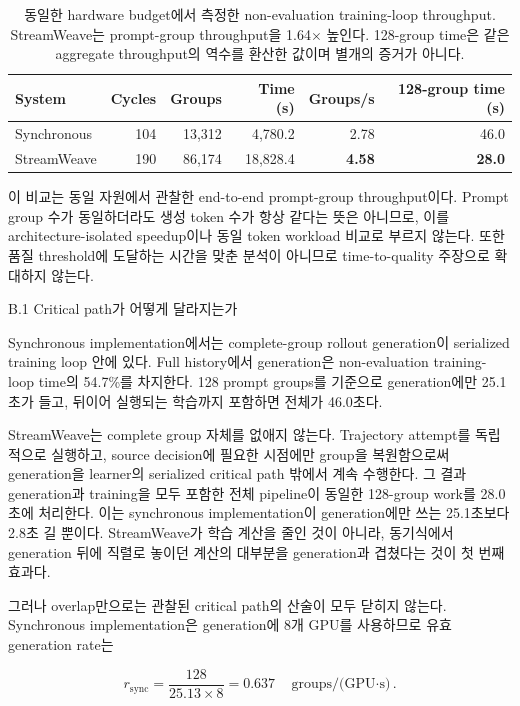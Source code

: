 \begin{table}[h]
\centering
\begin{tabular}{lrrrrr}
\hline
System & Cycles & Groups & Time (s) & Groups/s & 128-group time (s) \\
\hline
Synchronous & 104 & 13{,}312 & 4{,}780.2 & 2.78 & 46.0 \\
StreamWeave & 190 & 86{,}174 & 18{,}828.4 & \textbf{4.58} & \textbf{28.0} \\
\hline
\end{tabular}
\caption{동일한 hardware budget에서 측정한 non-evaluation training-loop throughput.
StreamWeave는 prompt-group throughput을 1.64$\times$ 높인다. 128-group time은 같은
aggregate throughput의 역수를 환산한 값이며 별개의 증거가 아니다.}
\label{tab:streamweave-efficiency}
\end{table}

이 비교는 동일 자원에서 관찰한 end-to-end prompt-group throughput이다. Prompt group 수가
동일하더라도 생성 token 수가 항상 같다는 뜻은 아니므로, 이를 architecture-isolated speedup이나
동일 token workload 비교로 부르지 않는다. 또한 품질 threshold에 도달하는 시간을 맞춘 분석이
아니므로 time-to-quality 주장으로 확대하지 않는다.

B.1 Critical path가 어떻게 달라지는가

Synchronous implementation에서는 complete-group rollout generation이 serialized training
loop 안에 있다. Full history에서 generation은 non-evaluation training-loop time의 54.7\%를
차지한다. 128 prompt groups를 기준으로 generation에만 25.1초가 들고, 뒤이어 실행되는 학습까지
포함하면 전체가 46.0초다.

StreamWeave는 complete group 자체를 없애지 않는다. Trajectory attempt를 독립적으로 실행하고,
source decision에 필요한 시점에만 group을 복원함으로써 generation을 learner의 serialized
critical path 밖에서 계속 수행한다. 그 결과 generation과 training을 모두 포함한 전체 pipeline이
동일한 128-group work를 28.0초에 처리한다. 이는 synchronous implementation이 generation에만
쓰는 25.1초보다 2.8초 길 뿐이다. StreamWeave가 학습 계산을 줄인 것이 아니라, 동기식에서
generation 뒤에 직렬로 놓이던 계산의 대부분을 generation과 겹쳤다는 것이 첫 번째 효과다.

그러나 overlap만으로는 관찰된 critical path의 산술이 모두 닫히지 않는다. Synchronous
implementation은 generation에 8개 GPU를 사용하므로 유효 generation rate는

\[
r_{\mathrm{sync}}
=
\frac{128}{25.13\times 8}
=
0.637
\quad\text{groups/(GPU$\cdot$s)}.
\]


